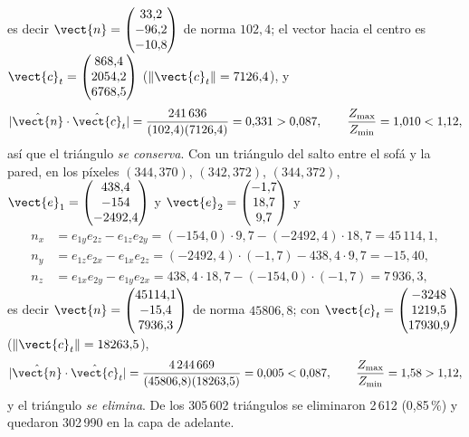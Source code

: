 es decir $\vect{n}=\begin{pmatrix} 33{,}2 \\ -96{,}2 \\ -10{,}8 \end{pmatrix}$ de norma $102{,}4$; el vector hacia el centro es $\vect{c}_t=\begin{pmatrix} 868{,}4 \\ 2054{,}2 \\ 6768{,}5 \end{pmatrix}$ ($\lVert\vect{c}_t\rVert=7126{,}4$), y
\begin{equation}
\lvert\hat{\vect{n}}\cdot\hat{\vect{c}}_t\rvert=\frac{241\,636}{(102{,}4)(7126{,}4)}=0{,}331>0{,}087,\qquad \frac{Z_{\max}}{Z_{\min}}=1{,}010<1{,}12,
\end{equation}
así que el triángulo \emph{se conserva}. Con un triángulo del salto entre el sofá y la pared, en los píxeles $(344,370)$, $(342,372)$, $(344,372)$,
$\vect{e}_1=\begin{pmatrix} 438{,}4 \\ -154 \\ -2492{,}4 \end{pmatrix}$ y $\vect{e}_2=\begin{pmatrix} -1{,}7 \\ 18{,}7 \\ 9{,}7 \end{pmatrix}$ y
\begin{align*}
n_x&=e_{1y}e_{2z}-e_{1z}e_{2y}=\left(-154{,}0\right)\cdot9{,}7-\left(-2492{,}4\right)\cdot18{,}7=45\,114{,}1,\\
n_y&=e_{1z}e_{2x}-e_{1x}e_{2z}=\left(-2492{,}4\right)\cdot\left(-1{,}7\right)-438{,}4\cdot9{,}7=-15{,}40,\\
n_z&=e_{1x}e_{2y}-e_{1y}e_{2x}=438{,}4\cdot18{,}7-\left(-154{,}0\right)\cdot\left(-1{,}7\right)=7\,936{,}3,
\end{align*}
es decir $\vect{n}=\begin{pmatrix} 45114{,}1 \\ -15{,}4 \\ 7936{,}3 \end{pmatrix}$ de norma $45806{,}8$; con $\vect{c}_t=\begin{pmatrix} -3248 \\ 1219{,}5 \\ 17930{,}9 \end{pmatrix}$ ($\lVert\vect{c}_t\rVert=18263{,}5$),
\begin{equation}
\lvert\hat{\vect{n}}\cdot\hat{\vect{c}}_t\rvert=\frac{4\,244\,669}{(45806{,}8)(18263{,}5)}=0{,}005<0{,}087,\qquad \frac{Z_{\max}}{Z_{\min}}=1{,}58>1{,}12,
\end{equation}
y el triángulo \emph{se elimina}. De los 305\,602 triángulos se eliminaron 2\,612 (0{,}85\,\%) y quedaron 302\,990 en la capa de adelante.

